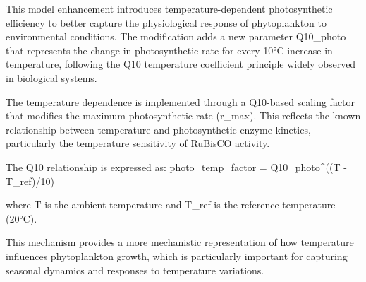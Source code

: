 This model enhancement introduces temperature-dependent photosynthetic efficiency to better capture the physiological response of phytoplankton to environmental conditions. The modification adds a new parameter Q10_photo that represents the change in photosynthetic rate for every 10°C increase in temperature, following the Q10 temperature coefficient principle widely observed in biological systems.

The temperature dependence is implemented through a Q10-based scaling factor that modifies the maximum photosynthetic rate (r_max). This reflects the known relationship between temperature and photosynthetic enzyme kinetics, particularly the temperature sensitivity of RuBisCO activity.

The Q10 relationship is expressed as:
photo_temp_factor = Q10_photo^((T - T_ref)/10)

where T is the ambient temperature and T_ref is the reference temperature (20°C).

This mechanism provides a more mechanistic representation of how temperature influences phytoplankton growth, which is particularly important for capturing seasonal dynamics and responses to temperature variations.
